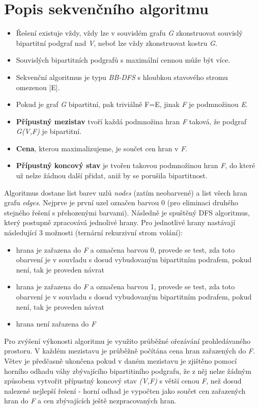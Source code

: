 \documentclass{article}%
\begin{document}
\section{Popis sekvenčního algoritmu}%
\label{sec:Popissekvencni}%
\begin{itemize}
    \item Řešení existuje vždy, vždy lze v souvislém grafu \textit{G} zkonstruovat souvislý bipartitní podgraf nad \textit{V}, neboť lze vždy zkonstruovat kostru \textit{G}.
    \item Souvislých bipartitních podgrafů s maximální cennou může být více.
    \item Sekvenční algoritmus je typu \textit{BB-DFS} s hloubkou stavového stromu omezenou |E|.
    \item Pokud je graf \textit{G} bipartitní, pak triviálně F=E, jinak \textit{F} je podmnožinou \textit{E}.
    \item \textbf{Přípustný mezistav} tvoří každá podmnožina hran \textit{F} taková, že podgraf \textit{G(V,F)} je bipartitní.
    \item \textbf{Cena}, kterou maximalizujeme, je součet cen hran v \textit{F}.
    \item \textbf{Přípustný koncový stav} je tvořen takovou podmnožinou hran \textit{F}, do které už nelze žádnou další přidat, aniž by se porušila bipartitnost.
\end{itemize}%

Algoritmus dostane list barev uzlů \textit{nodes} (zatím neobarvené) a list všech hran grafu \textit{edges}. Nejprve je první uzel označen barvou 0 (pro eliminaci druhého stejného řešení s přehozenými barvami). Následně je spuštěný DFS algoritmus, který postupně zpracovává jednolivé hrany. Pro jednotlivé hrany nastávají následující 3 možnosti (ternární rekurzivní strom volání):
\begin{itemize}
    \item hrana je zařazena do \textit{F} a označena barvou 0, provede se test, zda toto obarvení je v souvladu s dosud vybudovaným bipartitním podrafem, pokud není, tak je proveden návrat
    \item hrana je zařazena do \textit{F} a označena barvou 1, provede se test, zda toto obarvení je v souvladu s dosud vybudovaným bipartitním podrafem, pokud není, tak je proveden návrat
    \item hrana není zařazena do \textit{F}
\end{itemize}

Pro zvýšení výkonosti algoritmu je využito průběžné ořezávání prohledávaného prostoru. V každém mezistavu je průběžně počítána cena hran zařazených do \textit{F}. Větev je předčasně ukončena pokud v daném mezistavu je zjištěno pomocí horního odhadu váhy zbývajícího bipartitiního podgrafu, že z něj nelze žádným způsobem vytvořit přípustný koncový stav \textit{(V,F)} s větší cenou \textit{F}, než dosud nalezené nejlepší řešení - horní odhad je vypočten jako součet cen zařazených hran do \textit{F} a cen zbývajících ještě nezpracovaných hran.
\end{document}
